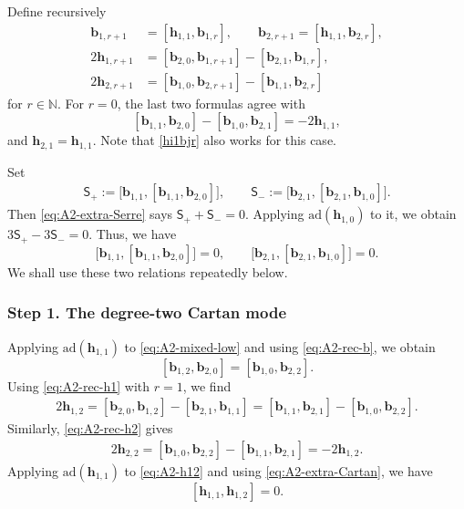 \documentclass[11pt,reqno]{amsart}
\numberwithin{equation}{section}
\theoremstyle{definition}
\theoremstyle{remark}
\newcommand{\beq}{\begin{equation}}
\newcommand{\eeq}{\end{equation}}
\newcommand{\bN}{\mathbb{N}}
\newcommand{\bb}{\mathbf{b}}
\newcommand{\bh}{\mathbf{h}}
\newcommand{\ad}{\mathrm{ad}}
\begin{document}
Define recursively
\begin{align}
\bb_{1,r+1}
&=
[\bh_{1,1},\bb_{1,r}],
\qquad 
\bb_{2,r+1}=
[\bh_{1,1},\bb_{2,r}],
\label{eq:A2-rec-b}
\\
2\bh_{1,r+1}
&=
[\bb_{2,0},\bb_{1,r+1}]
-
[\bb_{2,1},\bb_{1,r}],
\label{eq:A2-rec-h1}
\\
2\bh_{2,r+1}
&=
[\bb_{1,0},\bb_{2,r+1}]
-
[\bb_{1,1},\bb_{2,r}]
\label{eq:A2-rec-h2}
\end{align}
for $r\in\bN$.  For $r=0$, the last two formulas agree with \begin{equation}\label{eq:A2-mixed-low}
[\bb_{1,1},\bb_{2,0}]
-
[\bb_{1,0},\bb_{2,1}]
=
-2\bh_{1,1},
\end{equation}
and $\bh_{2,1}=\bh_{1,1}$. Note that \eqref{hi1bjr} also works for this case.

Set
\begin{align*}
\mathsf S_+
:=
\big[\bb_{1,1},[\bb_{1,1},\bb_{2,0}]\big],
\qquad 
\mathsf S_-
:=
\big[\bb_{2,1},[\bb_{2,1},\bb_{1,0}]\big].
\end{align*}
Then \eqref{eq:A2-extra-Serre} says $\mathsf S_++\mathsf S_-=0$. Applying $\ad(\bh_{1,0})$ to it, we obtain $3\mathsf S_+-3\mathsf S_-=0$. Thus, we have 
\begin{equation}\label{eq:A2-two-shifted-Serre}
\big[\bb_{1,1},[\bb_{1,1},\bb_{2,0}]\big]=0,
\qquad
\big[\bb_{2,1},[\bb_{2,1},\bb_{1,0}]\big]=0.
\end{equation}
We shall use these two relations repeatedly below.

\subsubsection*{Step 1. The degree-two Cartan mode}

Applying $\ad(\bh_{1,1})$ to
\eqref{eq:A2-mixed-low} and using
\eqref{eq:A2-rec-b}, we obtain
\beq\label{eq:A2-b10b20}
[\bb_{1,2},\bb_{2,0}]
=
[\bb_{1,0},\bb_{2,2}]. 
\eeq
Using \eqref{eq:A2-rec-h1} with $r=1$, we find
\begin{align}
2\bh_{1,2}
=
[\bb_{2,0},\bb_{1,2}]
-
[\bb_{2,1},\bb_{1,1}]=
[\bb_{1,1},\bb_{2,1}]
-
[\bb_{1,0},\bb_{2,2}].
\label{eq:A2-h12}
\end{align}
Similarly, \eqref{eq:A2-rec-h2} gives
\begin{align*}
2\bh_{2,2}
=
[\bb_{1,0},\bb_{2,2}]
-
[\bb_{1,1},\bb_{2,1}]=
-2\bh_{1,2}.
\end{align*}
Applying $\mathrm{ad}(\bh_{1,1})$ to \eqref{eq:A2-h12} and using \eqref{eq:A2-extra-Cartan}, we have
\begin{equation}\label{eq:A2-h11h12}
[\bh_{1,1},\bh_{1,2}]
=
0.
\end{equation}
\end{document}
